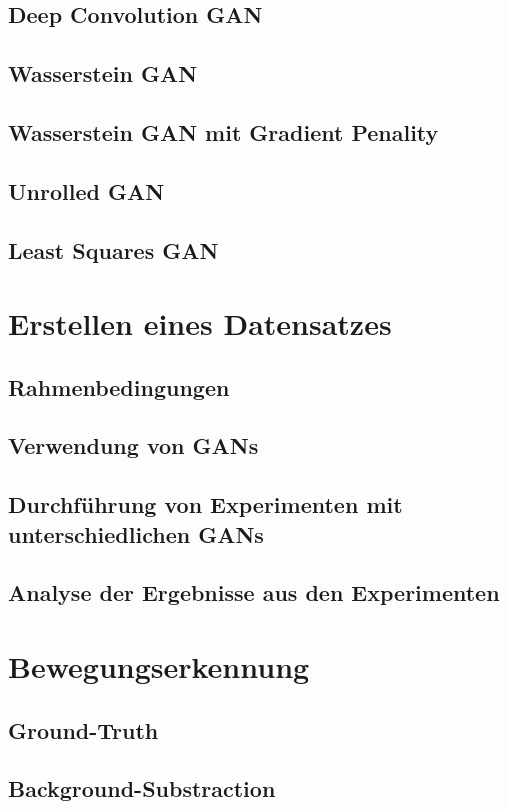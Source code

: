 \documentclass{hsflensburg}
\begin{document}
  \section{Deep Convolution GAN}
  \section{Wasserstein GAN}
  \section{Wasserstein GAN mit Gradient Penality}
  \section{Unrolled GAN}
  \section{Least Squares GAN}

  \chapter{Erstellen eines Datensatzes}
  \section{Rahmenbedingungen}
  \section{Verwendung von GANs}
  \section{Durchführung von Experimenten mit unterschiedlichen GANs}
  \section{Analyse der Ergebnisse aus den Experimenten}

  \chapter{Bewegungserkennung}
  \section{Ground-Truth}
  \section{Background-Substraction}
\end{document}
